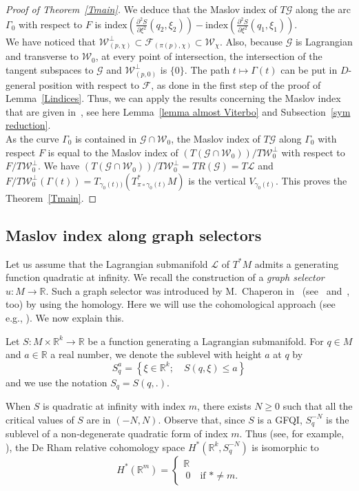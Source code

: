 \documentclass[AHL, Unicode, longabstracts, published]{cedram}
\newcommand*\cF{\mathcal{F}}
\newcommand*\cg{\mathcal{G}}
\newcommand*\cl{\mathcal{L}}
\newcommand*\cw{\mathcal{W}}
\newcommand*\R{\mathbb{R}}
\begin{document}
\begin{proof}[Proof of Theorem~\ref{Tmain}]
We deduce that the Maslov index of $T\cg$ along the arc $\Gamma_0$ with respect to $F$ is $\text{index}(\frac{\partial^2 S}{\partial \xi^2}(q_2, \xi_2))-\text{index}(\frac{\partial^2 S}{\partial \xi^2}(q_1, \xi_1))$.\\
We have noticed that $\cw^\bot_{(p,\chi)} \subset \cF_{(\pi(p),\chi)}\subset \cw_\chi$. Also, because $\cg$ is Lagrangian and transverse to $\cw_0$, at every point of intersection, the intersection of the tangent subspaces to $\cg$ and $\cw^\bot_{(p,0)}$ is $\{ 0\}$. {The path $t\mapsto \Gamma(t)$ can be put in $D$-general position with respect to $\cF$, as done in the first step of the proof of Lemma~\ref{Lindices}. Thus, we can apply the results concerning the Maslov index that are given in~\cite[Section~2]{Vit1987}, see here Lemma~\ref{lemma almost Viterbo} and Subsection~\ref{sym reduction}}.
\\
As the curve $\Gamma_0$ is contained in $\cg\cap \cw_0$, the Maslov index of $T\cg$ along $\Gamma_0$ with respect $F$ is equal to the Maslov index of $(T(\cg\cap \cw_0))/T\cw^\bot_0$ with respect to $F/T\cw^\bot_0$. We have $(T(\cg\cap \cw_0))/T\cw^\bot_0={ T}R(\cg)={ T}\cl$ and $F/T\cw^\bot_0(\Gamma(t))=T_{\gamma_0(t))}(T^*_{\pi\circ \gamma_0(t)}M)$ is the vertical {$V_{\gamma_0(t)}$}. This proves the Theorem~\ref{Tmain}.
\end{proof}


\subsection{Maslov index along graph selectors}\label{SMaslocalongselec}

Let us assume that the Lagrangian submanifold $\cl$ of $T^*M$ admits a generating function {quadratic at infinity}. We recall the construction of a {\sl graph selector} $u:M\rightarrow \R$. Such a graph selector was introduced by M.~Chaperon in~\cite{Chap1991} (see~\cite{PPS2003} and~\cite{Sib2004}, too) by using the homology. Here we will use the cohomological approach (see e.g., \cite{ArnaVent2017}). We now explain this.
\begin{notas}
Let $S: M\times \R^k\rightarrow \R$ be a function generating a Lagrangian submanifold. For $q\in M$ and $a\in\R$ a real number, we denote the sublevel with height $a$ at $q$ by
\[
S^a_q=\left\{\xi\in\R^k; \quad S(q, \xi)\leq a\right\}
\]
and we use the notation $S_q=S(q,.)$.
\end{notas}

When $S$ is quadratic at infinity with index $m$, there exists $N\geq 0$ such that all the critical values of $S$ are in $(-N, N)$. Observe that, since $S$ is a GFQI, $S_q^{-N}$ is the sublevel of a non-degenerate quadratic form of index $m$. Thus {(see, for example, \cite{Milnor})}, the De Rham relative cohomology space $H^*(\R^k, S_q^{-N})$ is isomorphic to
\[
H^*(\R^m)=
\begin{cases}
\R\\\
0\quad\text{if }*\neq m.
\end{cases}
\]
\end{document}
